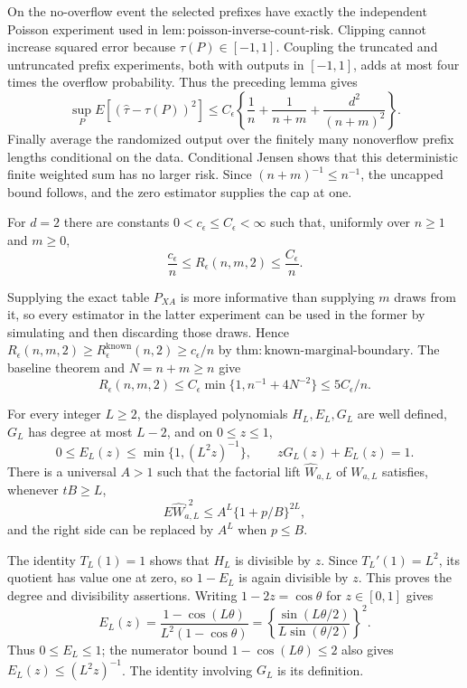 On the no-overflow event the selected prefixes have exactly the independent Poisson experiment used in \(\mathrm{lem:poisson\mbox{-}inverse\mbox{-}count\mbox{-}risk}\).  Clipping cannot increase squared error because \(\tau(P)\in[-1,1]\).  Coupling the truncated and untruncated prefix experiments, both with outputs in \([-1,1]\), adds at most four times the overflow probability.  Thus the preceding lemma gives
\[
 \sup_P E[(\widehat\tau-\tau(P))^2]
 \le C_\epsilon\left\{\frac1n+\frac1{n+m}+\frac{d^2}{(n+m)^2}\right\}.
\]
Finally average the randomized output over the finitely many nonoverflow prefix lengths conditional on the data.  Conditional Jensen shows that this deterministic finite weighted sum has no larger risk.  Since \((n+m)^{-1}\le n^{-1}\), the uncapped bound follows, and the zero estimator supplies the cap at one.

For \(d=2\) there are constants \(0<c_\epsilon\le C_\epsilon<\infty\) such that, uniformly over \(n\ge1\) and \(m\ge0\),
\[
 \frac{c_\epsilon}{n}\le R_\epsilon(n,m,2)\le\frac{C_\epsilon}{n}.
\]

Supplying the exact table \(P_{XA}\) is more informative than supplying \(m\) draws from it, so every estimator in the latter experiment can be used in the former by simulating and then discarding those draws.  Hence \(R_\epsilon(n,m,2)\ge R_\epsilon^{\mathrm{known}}(n,2)\ge c_\epsilon/n\) by \(\mathrm{thm:known\mbox{-}marginal\mbox{-}boundary}\).  The baseline theorem and \(N=n+m\ge n\) give
\[
 R_\epsilon(n,m,2)\le C_\epsilon\min\{1,n^{-1}+4N^{-2}\}\le5C_\epsilon/n.
\]

For every integer \(L\ge2\), the displayed polynomials \(H_L,E_L,G_L\) are well defined, \(G_L\) has degree at most \(L-2\), and on \(0\le z\le1\),
\[
 0\le E_L(z)\le\min\{1,(L^2z)^{-1}\},\qquad zG_L(z)+E_L(z)=1.
\]
There is a universal \(A>1\) such that the factorial lift \(\widehat W_{a,L}\) of \(W_{a,L}\) satisfies, whenever \(tB\ge L\),
\[
 E\widehat W_{a,L}^{,2}\le A^L\{1+p/B\}^{2L},
\]
and the right side can be replaced by \(A^L\) when \(p\le B\).

The identity \(T_L(1)=1\) shows that \(H_L\) is divisible by \(z\).  Since \(T_L'(1)=L^2\), its quotient has value one at zero, so \(1-E_L\) is again divisible by \(z\).  This proves the degree and divisibility assertions.  Writing \(1-2z=\cos\theta\) for \(z\in[0,1]\) gives
\[
 E_L(z)=\frac{1-\cos(L\theta)}{L^2(1-\cos\theta)}
 =\left\{\frac{\sin(L\theta/2)}{L\sin(\theta/2)}\right\}^2.
\]
Thus \(0\le E_L\le1\); the numerator bound \(1-\cos(L\theta)\le2\) also gives \(E_L(z)\le(L^2z)^{-1}\).  The identity involving \(G_L\) is its definition.

